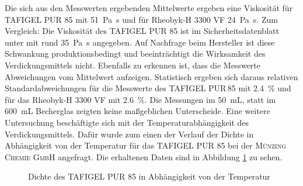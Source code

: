 Die sich aus den Messwerten ergebenden Mittelwerte ergeben eine Viskosität für TAFIGEL PUR 85 mit \SI{51}{\pascal \second} und für Rheobyk-H 3300 VF \SI{24}{\pascal \second}. Zum Vergleich: Die Viskosität des TAFIGEL PUR 85 ist im Sicherheitsdatenblatt unter  \cite{MunzingChemieGmbH.2020} mit rund \SI{35}{\pascal \second}  angegeben. Auf Nachfrage beim Hersteller ist diese Schwankung produktionsbedingt und beeinträchtigt die Wirksamkeit des Verdickungsmittels nicht. Ebenfalls zu erkennen ist, dass die Messwerte Abweichungen vom Mittelwert aufzeigen. Statistisch ergeben sich daraus relativen Standardabweichungen für die Messwerte des TAFIGEL PUR\,85 mit \SI{2,4}{\percent} und für das Rheobyk-H 3300 VF mit \SI{2,6}{\percent}. Die Messungen im \SI{50}{\milli \liter}, statt im \SI{600}{\milli \liter} Becherglas zeigten keine maßgeblichen Unterscheide.\linebreak
Eine weitere Untersuchung beschäftigte sich mit der Temperaturabhängigkeit des Verdickungsmittels. Dafür wurde zum einen der Verlauf der Dichte in Abhängigkeit von der Temperatur für das TAFIGEL PUR 85 bei der \textsc{Münzing Chemie GmbH} angefragt. Die erhaltenen Daten sind in Abbildung \ref{dia:dichte} zu sehen.


\begin{figure}[h]
	\begin{center}
		\caption{Dichte des TAFIGEL PUR 85 in Abhängigkeit von der Temperatur}
		\label{dia:dichte}
	\end{center}
\end{figure} 

